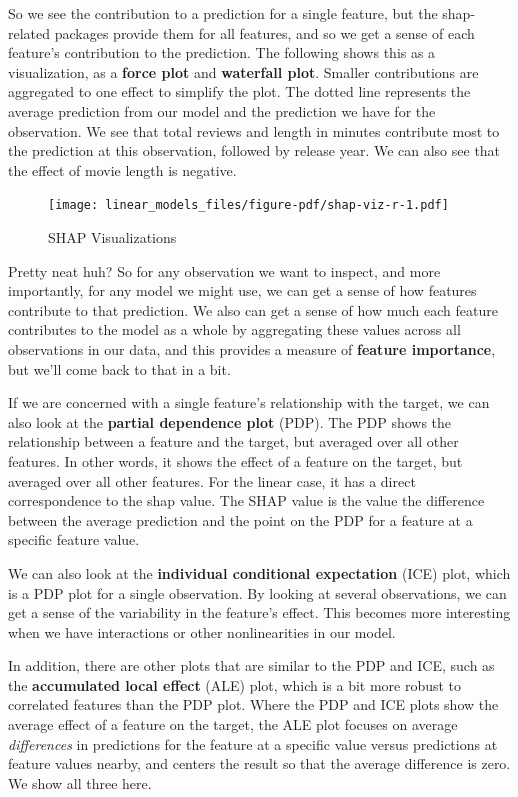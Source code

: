 \documentclass[
  letterpaper,
]{krantz}
\begin{document}
So we see the contribution to a prediction for a single feature, but the
shap-related packages provide them for all features, and so we get a
sense of each feature's contribution to the prediction. The following
shows this as a visualization, as a \textbf{force plot} and
\textbf{waterfall plot}. Smaller contributions are aggregated to one
effect to simplify the plot. The dotted line represents the average
prediction from our model and the prediction we have for the
observation. We see that total reviews and length in minutes contribute
most to the prediction at this observation, followed by release year. We
can also see that the effect of movie length is negative.

\begin{figure}

{\centering \texttt{[image: linear\_models\_files/figure-pdf/shap-viz-r-1.pdf]}

}

\caption{SHAP Visualizations}

\end{figure}

Pretty neat huh? So for any observation we want to inspect, and more
importantly, for any model we might use, we can get a sense of how
features contribute to that prediction. We also can get a sense of how
much each feature contributes to the model as a whole by aggregating
these values across all observations in our data, and this provides a
measure of \textbf{feature importance}, but we'll come back to that in a
bit.

If we are concerned with a single feature's relationship with the
target, we can also look at the \textbf{partial dependence plot} (PDP).
The PDP shows the relationship between a feature and the target, but
averaged over all other features. In other words, it shows the effect of
a feature on the target, but averaged over all other features. For the
linear case, it has a direct correspondence to the shap value. The SHAP
value is the value the difference between the average prediction and the
point on the PDP for a feature at a specific feature value.

We can also look at the \textbf{individual conditional expectation}
(ICE) plot, which is a PDP plot for a single observation. By looking at
several observations, we can get a sense of the variability in the
feature's effect. This becomes more interesting when we have
interactions or other nonlinearities in our model.

In addition, there are other plots that are similar to the PDP and ICE,
such as the \textbf{accumulated local effect} (ALE) plot, which is a bit
more robust to correlated features than the PDP plot. Where the PDP and
ICE plots show the average effect of a feature on the target, the ALE
plot focuses on average \emph{differences} in predictions for the
feature at a specific value versus predictions at feature values nearby,
and centers the result so that the average difference is zero. We show
all three here.
\end{document}
